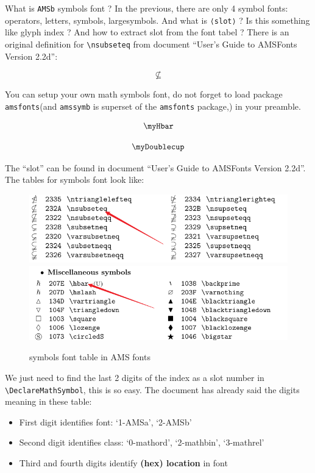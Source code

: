 \documentclass{article}
\begin{document}
What is \texttt{AMSb} symbols font ? In the previous, there are only 4 symbol fonts: operators, letters, symbols, largesymbols.
And what is \verb|⟨slot⟩| ? Is this something like glyph index ? And how to extract slot from the font tabel ? 
There is an original definition for \verb|\nsubseteq| from document ``User's Guide to AMSFonts Version 2.2d'':

\begin{code}
\[ \nsubseteq \]
\end{code}

You can setup your own math symbols font, do not forget to load package \verb|amsfonts|(and \texttt{amssymb} is superset of 
the \texttt{amsfonts} package,) in your preamble.

\begin{code}
\[ \myHbar \]

\[ \myDoublecup \]
\end{code}

The ``slot'' can be found in document ``User's Guide to AMSFonts Version 2.2d''. The tables for symbols font look like:

\begin{figure}[!htb]
  \centering
  \includegraphics[width=.75\linewidth]{symbols_font_table_I.png}
  \includegraphics[width=.75\linewidth]{symbols_font_table_II.png}
  \caption{symbols font table in AMS fonts}
  \label{fig:ams-symbols-font-table}
\end{figure}

We just need to find the last 2 digits of the index as a slot number in \verb|\DeclareMathSymbol|, this is so easy. The document has 
already said the digits meaning in these table:
\begin{itemize}
  \item First digit identifies font: `1-AMSa', `2-AMSb'
  \item Second digit identifies class: `0-mathord', `2-mathbin', `3-mathrel'
  \item Third and fourth digits identify \textbf{(hex) location} in font
\end{itemize}
\end{document}
